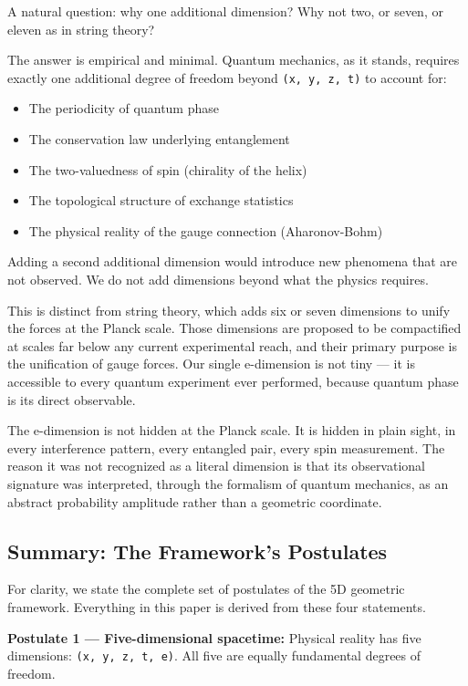 \documentclass[aps,prd,preprint,superscriptaddress,longbibliography,floatfix]{revtex4-2}
\theoremstyle{remark}
\begin{document}
A natural question: why one additional dimension? Why not two, or seven, or eleven as in string theory?

The answer is empirical and minimal. Quantum mechanics, as it stands, requires exactly one additional degree of freedom beyond \texttt{(x, y, z, t)} to account for:


\begin{itemize}
  \item The periodicity of quantum phase
  \item The conservation law underlying entanglement
  \item The two-valuedness of spin (chirality of the helix)
  \item The topological structure of exchange statistics
  \item The physical reality of the gauge connection (Aharonov-Bohm)
\end{itemize}

Adding a second additional dimension would introduce new phenomena that are not observed. We do not add dimensions beyond what the physics requires.

This is distinct from string theory, which adds six or seven dimensions to unify the forces at the Planck scale. Those dimensions are proposed to be compactified at scales far below any current experimental reach, and their primary purpose is the unification of gauge forces. Our single e-dimension is not tiny --- it is accessible to every quantum experiment ever performed, because quantum phase is its direct observable.

The e-dimension is not hidden at the Planck scale. It is hidden in plain sight, in every interference pattern, every entangled pair, every spin measurement. The reason it was not recognized as a literal dimension is that its observational signature was interpreted, through the formalism of quantum mechanics, as an abstract probability amplitude rather than a geometric coordinate.



\subsection{Summary: The Framework's Postulates}

For clarity, we state the complete set of postulates of the 5D geometric framework. Everything in this paper is derived from these four statements.

\textbf{Postulate 1 --- Five-dimensional spacetime:} Physical reality has five dimensions: \texttt{(x, y, z, t, e)}. All five are equally fundamental degrees of freedom.
\end{document}
